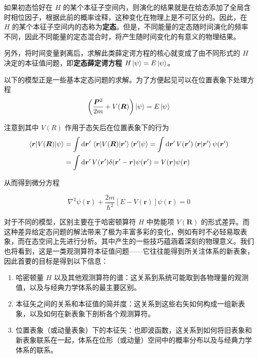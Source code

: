 \documentclass[cn,10pt,math=newtx,citestyle=gb7714-2015,bibstyle=gb7714-2015]{elegantbook}
\def\bm{\boldsymbol}
\def\d{\mathrm d}
\begin{document}
如果初态恰好在 $H$ 的某个本征子空间内，则演化的结果就是在给态添加了全局含时相位因子，根据此前的概率诠释，这种变化在物理上是不可区分的。因此，在 $H$ 的某个本征子空间内的态称为\textbf{定态}。但是，不同能量的定态随时间演化的频率不同，因此不同能量的定态混合时，将产生随时间变化的有意义的物理结果。

另外，将时间变量剥离后，求解此类薛定谔方程的核心就变成了由不同形式的 $H$ 决定的本征值问题，即\textbf{定态薛定谔方程} $H\ket{\psi}=E\ket{\psi}$。

以下的模型正是一些基本定态问题的求解。为了方便起见可以在位置表象下处理方程
\begin{equation}
    \left(\frac{\bm P^2}{2m}+V(\bm R)\right)\ket{\psi}=E\ket{\psi}
\end{equation}

注意到其中 $V(R)$ 作用于态矢后在位置表象下的行为
\begin{align}
    \label{eq:potfuncpos}
    \braket{\bm r|V(\bm R)|\psi} &= \int\d\bm r'\,\braket{\bm r|V(\bm R)|\bm r'}\braket{\bm r'|\psi} = \int\d\bm r'\,V(\bm r')\braket{\bm r|\bm r'}\psi(\bm r')\\&=\int\d\bm r'\,V(\bm r')\delta(\bm r'-\bm r)\psi(\bm r')=V(\bm r)\psi(\bm r)
\end{align}

从而得到微分方程

\begin{equation}\label{eq:sttnry_stt_schrdngr_eqtn}
    \nabla^2\psi(\bm r)+\frac{2m}{\hbar^2}[E-V(\bm r)]\psi(\bm r)=0
\end{equation}

对于不同的模型，区别主要在于哈密顿算符 $H$ 中势能项 $V(\bm R)$ 的形式差异。而这种差异给定态问题的解法带来了极为丰富多彩的变化，例如有时不必轻易取表象，而在态空间上先进行分析。其中产生的一些技巧蕴涵着深刻的物理意义。我们也将看到，这是一类观测算符本征值问题——它往往能得到所关注体系的新表象，因此首要的目标是得到以下信息：
\begin{enumerate}
    \item 哈密顿量 $H$ 以及其他观测算符的谱：这关系到系统可能取到各物理量的观测值，以及与经典力学体系的最主要区别。
    \item 本征矢之间的关系和本征值的简并度：这关系到这些右矢如何构成一组新表象，以及如何在新表象下剖析各个观测算符。
    \item 位置表象（或动量表象）下的本征矢：也即波函数，这关系到如何将旧表象和新表象联系在一起，体系在位形（或动量）空间中的概率分布以及与经典力学体系的联系。
\end{enumerate}
\end{document}
